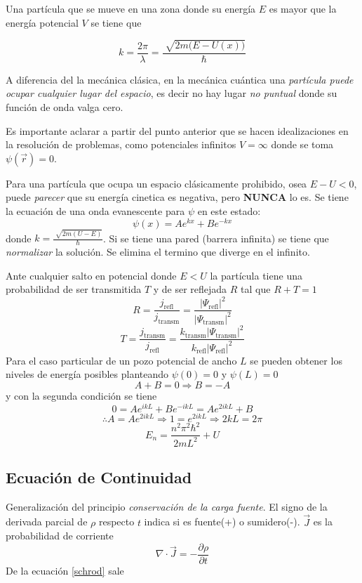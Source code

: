 \documentclass[10pt,twocolumn,titlepage]{article}
\newcommand{\spartial}[2]{\frac{\partial #1}{\partial #2}}
\newcommand{\psix}{\psi (x)}
\newcommand{\transm}{\textrm{transm}}
\newcommand{\refl}{\textrm{refl}}
\newcommand{\di}{\,\textrm{d}}
\begin{document}
Una partícula que se mueve en una zona donde su energía $E$ es mayor que la energía potencial $V$ se tiene que 

$$ k=\frac{2\pi}{\lambda}=\frac{\sqrt[]{2m\big(E-U(x)\big)}}{\hbar}$$

A diferencia del la mecánica clásica, en la mecánica cuántica una \emph{partícula puede ocupar cualquier lugar del espacio}, es decir no hay lugar \emph{no puntual} donde su función de onda valga cero.

Es importante aclarar a partir del punto anterior que se hacen idealizaciones en la resolución de problemas, como potenciales infinitos $V=\infty$ donde se toma $\psi (\vec{r})=0$.\par

Para una partícula que ocupa un espacio clásicamente prohibido, osea $E-U<0$, puede \emph{parecer} que su energía cinetica es negativa, pero \textbf{NUNCA} lo es. Se tiene la ecuación de una onda evanescente para $\psi$ en este estado:
$$  \psix = Ae^{k x}+B e^{-k x}  $$
donde $k=\frac{\sqrt[]{2m(U-E)}}{\hbar}$. Si se tiene una pared (barrera infinita) se tiene que \emph{normalizar} la solución. Se elimina el termino que diverge en el infinito.

Ante cualquier salto en potencial donde $E<U$ la partícula tiene una probabilidad de ser transmitida $T$ y de ser reflejada $R$ tal que $R+T=1$
$$R=\frac{j_{\refl}}{j_{\transm}}=\frac{|\Psi_{\refl}|^2}{|\Psi_{\transm}|^2} $$
$$T=\frac{j_{\transm}}{j_{\refl}}=\frac{k_{\transm}|\Psi_{\transm}|^2}{k_{\refl}|\Psi_{\refl}|^2} $$
Para el caso particular de un pozo potencial de ancho $L$ se pueden obtener los niveles de energía posibles planteando $\psi(0)=0 $ y $\psi(L)=0$
$$A+B=0\Rightarrow B=-A $$
y con la segunda condición se tiene
$$0=Ae^{ikL}+Be^{-ikL}=Ae^{2ikL}+B$$
$$\therefore A=Ae^{2ikL}\Rightarrow 1=e^{2ikL}\Rightarrow 2kL=2\pi$$
$$E_n=\frac{n^2\pi^2\hbar^2}{2mL^2}+U $$
\subsection{Ecuación de Continuidad}
Generalización del principio \emph{conservación de la carga fuente}. El signo de la derivada parcial de $\rho$ respecto $t$ indica si es fuente(+) o sumidero(-). $\vec{J}$ es la probabilidad de corriente
$$ \nabla \cdot \vec{J} =-\spartial{\rho}{t}  $$
De la ecuación \eqref{schrod} sale
\end{document}
